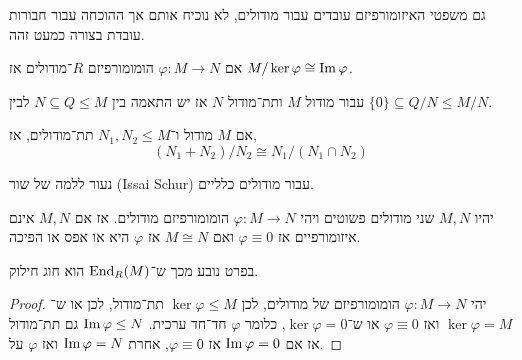 גם משפטי האיזומורפיזם עובדים עבור מודולים, לא נוכיח אותם אך ההוכחה עבור חבורות עובדת בצורה כמעט זהה.
\begin{theorem}
	אם $\varphi : M \to N$ הומומורפיזם $R$־מודולים אז $M / \ker \varphi \cong \operatorname{Im} \varphi$.
\end{theorem}
\begin{theorem}[ההתאמה]
	עבור מודול $M$ ותת־מודול $N$ אז יש התאמה בין $N \subseteq Q \le M$ לבין $\{ 0 \} \subseteq Q / N \le M / N$.
\end{theorem}
\begin{theorem}
	אם $M$ מודול ו־$N_1, N_2 \le M$ תת־מודולים, אז,
	\[
		(N_1 + N_2) / N_2
		\cong N_1 / (N_1 \cap N_2)
	\]
\end{theorem}
נעור ללמה של שור (Issai Schur) עבור מודולים כלליים.
\begin{lemma}[שור]\label{lemma_schur}
	יהיו $M, N$ שני מודולים פשוטים ויהי $\varphi : M \to N$ הומומורפיזם מודולים.
	אז אם $M, N$ אינם איזומורפיים אז $\varphi \equiv 0$ ואם $M \cong N$ אז $\varphi$ היא או אפס או הפיכה.
\end{lemma}
בפרט נובע מכך ש־$\operatorname{End}_R(M)$ הוא חוג חילוק.
\begin{proof}
	יהי $\varphi : M \to N$ הומומורפיזם של מודולים, לכן $\ker \varphi \le M$ תת־מודול, לכן או ש־$\ker \varphi = M$ ואז $\varphi \equiv 0$ או ש־$\ker \varphi = 0$, כלומר $\varphi$ חד־חד ערכית.
	$\operatorname{Im} \varphi \le N$ גם תת־מודול אז אם $\operatorname{Im} \varphi = 0$ אז $\varphi \equiv 0$, אחרת $\operatorname{Im} \varphi = N$ ואז $\varphi$ על.
\end{proof}

